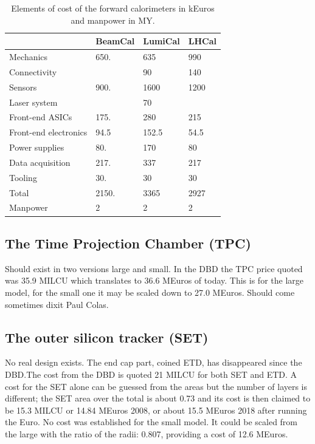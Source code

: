  \begin{table}\hspace*{-0cm}\small 
\begin{tabular}[h!]{ l p{0.2\hsize}p{0.2\hsize}p{0.2\hsize} }
\toprule
& BeamCal & LumiCal & LHCal \\
\midrule
Mechanics              & 650.   & 635    & 990   \\
Connectivity           &        & 90     & 140   \\
Sensors                & 900.   & 1600   & 1200  \\
Laser system           &        & 70     &       \\
Front-end ASICs        & 175.   & 280    & 215   \\
Front-end electronics  & 94.5   & 152.5  & 54.5  \\
Power supplies         & 80.    & 170    & 80    \\
Data acquisition       & 217.   & 337    & 217   \\
Tooling                & 30.    & 30     & 30    \\
\midrule
Total                  & 2150.  & 3365   & 2927  \\
\midrule
Manpower &2  &2 & 2 \\
\bottomrule
\end{tabular}
\caption{\label{FCals_summary}Elements of cost of the forward calorimeters in kEuros and manpower in MY.}
\end{table}

\subsection{The Time Projection Chamber (TPC)}
Should exist in two versions large and small. In the DBD the TPC price quoted was 35.9 MILCU which translates to 36.6 MEuros of today. This is for the large model, for the small one it may be scaled down to 27.0 MEuros. Should come sometimes dixit Paul Colas.

\subsection{The outer silicon tracker (SET)}
No real design exists. The end cap part, coined ETD, has disappeared since the DBD.The cost from the DBD is quoted 21 MILCU for both SET and ETD. A cost for the SET alone can be guessed from the areas but the number of layers is different; the SET area over the total is about 0.73 and its cost is then claimed to be 15.3 MILCU or 14.84 MEuros 2008, or about 15.5 MEuros 2018 after running the Euro. 
No cost was established for the small model. It could be scaled from the large with the ratio of the radii: 0.807, providing a cost of 12.6 MEuros.

